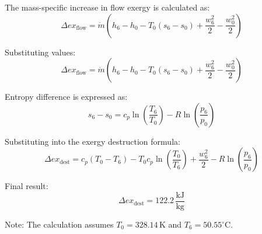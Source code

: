 The mass-specific increase in flow exergy is calculated as:  
\[
\Delta ex_{\text{flow}} = \dot{m} \left( h_6 - h_0 - T_0 (s_6 - s_0) + \frac{w_6^2}{2} - \frac{w_0^2}{2} \right)  
\]  

Substituting values:  
\[
\Delta ex_{\text{flow}} = \dot{m} \left( h_6 - h_0 - T_0 (s_6 - s_0) + \frac{w_6^2}{2} - \frac{w_0^2}{2} \right)  
\]  

Entropy difference is expressed as:  
\[
s_6 - s_0 = c_p \ln \left( \frac{T_6}{T_0} \right) - R \ln \left( \frac{p_6}{p_0} \right)  
\]  

Substituting into the exergy destruction formula:  
\[
\Delta ex_{\text{dest}} = c_p (T_0 - T_6) - T_0 c_p \ln \left( \frac{T_0}{T_6} \right) + \frac{w_6^2}{2} - R \ln \left( \frac{p_6}{p_0} \right)  
\]  

Final result:  
\[
\Delta ex_{\text{dest}} = 122.2 \, \frac{\text{kJ}}{\text{kg}}  
\]  

Note: The calculation assumes \( T_0 = 328.14 \, \text{K} \) and \( T_6 = 50.55^\circ \text{C} \).